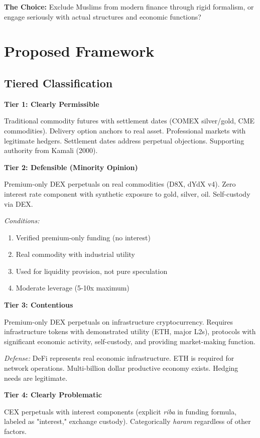 \documentclass[10pt,twocolumn]{article}
\begin{document}
\textbf{The Choice:} Exclude Muslims from modern finance through rigid formalism, or engage seriously with actual structures and economic functions?

\section{Proposed Framework}

\subsection{Tiered Classification}

\textbf{Tier 1: Clearly Permissible}

Traditional commodity futures with settlement dates (COMEX silver/gold, CME commodities). Delivery option anchors to real asset. Professional markets with legitimate hedgers. Settlement dates address perpetual objections. Supporting authority from Kamali (2000).

\textbf{Tier 2: Defensible (Minority Opinion)}

Premium-only DEX perpetuals on real commodities (D8X, dYdX v4). Zero interest rate component with synthetic exposure to gold, silver, oil. Self-custody via DEX.

\textit{Conditions:}
\begin{enumerate}
    \item Verified premium-only funding (no interest)
    \item Real commodity with industrial utility
    \item Used for liquidity provision, not pure speculation
    \item Moderate leverage (5-10x maximum)
\end{enumerate}

\textbf{Tier 3: Contentious}

Premium-only DEX perpetuals on infrastructure cryptocurrency. Requires infrastructure tokens with demonstrated utility (ETH, major L2s), protocols with significant economic activity, self-custody, and providing market-making function.

\textit{Defense:} DeFi represents real economic infrastructure. ETH is required for network operations. Multi-billion dollar productive economy exists. Hedging needs are legitimate.

\textbf{Tier 4: Clearly Problematic}

CEX perpetuals with interest components (explicit \textit{riba} in funding formula, labeled as "interest," exchange custody). Categorically \textit{haram} regardless of other factors.
\end{document}
